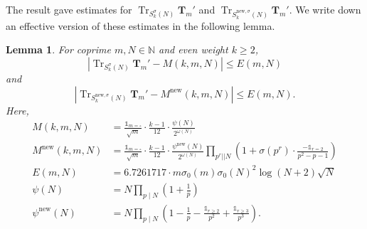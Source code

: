 \documentclass[11pt,letterpaper,reqno]{amsart}
\newtheorem{lemma}[theorem]{Lemma}
\theoremstyle{definition}
\numberwithin{equation}{section}
\numberwithin{figure}{section}
\numberwithin{table}{section}
\newcommand{\nw}{\mathrm{new}}
\begin{document}
The result \cite[Corollary 3.2]{RVWX26} gave estimates for $\operatorname{Tr}_{S_k^\sigma(N)}\mathbf{T}_m'$ and $\operatorname{Tr}_{S_k^{\nw, \sigma}(N)}\mathbf{T}_m'$. We write down an effective version of these estimates in the following lemma.
\begin{lemma}\label{lem:trace}
    For coprime $m, N \in \mathbb{N}$ and even weight $k \geq 2$,
    $$\left| \operatorname{Tr}_{S_k^\sigma(N)}\mathbf{T}_m' - M(k, m, N) \right| \leq E(m, N)$$
    and
    $$\left| \operatorname{Tr}_{S_k^{\nw, \sigma}(N)}\mathbf{T}_m' - M^{\nw}(k, m, N) \right| \leq E(m, N).$$
Here,
\begin{align*}
    M(k, m, N) &= \frac{\mathds{1}_{m = \square}}{\sqrt{m}} \cdot \frac{k - 1}{12} \cdot \frac{\psi(N)}{2^{\omega(N)}}\\
    M^{\nw}(k, m, N) &= \frac{\mathds{1}_{m = \square}}{\sqrt{m}} \cdot \frac{k - 1}{12} \cdot \frac{\psi^{\nw}(N)}{2^{\omega(N)}} \prod_{p^r || N} \left( 1 + \sigma(p^r) \cdot \frac{-\mathds{1}_{r = 2}}{p^2 - p - 1}  \right)\\
    E(m, N) &= 6.7261717 \cdot  m \sigma_0(m) \sigma_0(N)^2 \log(N + 2) \sqrt{N}\\
    \psi(N) &= N \prod_{p \mid N} \left(1 + \frac{1}{p} \right)\\
    \psi^{\nw}(N) &= N \prod_{p \mid N} \left(1 - \frac{1}{p} -  \frac{\mathds{1}_{r \geq 2}}{p^2} + \frac{\mathds{1}_{r \geq 3}}{p^3} \right).
\end{align*}
\end{lemma}
\end{document}
